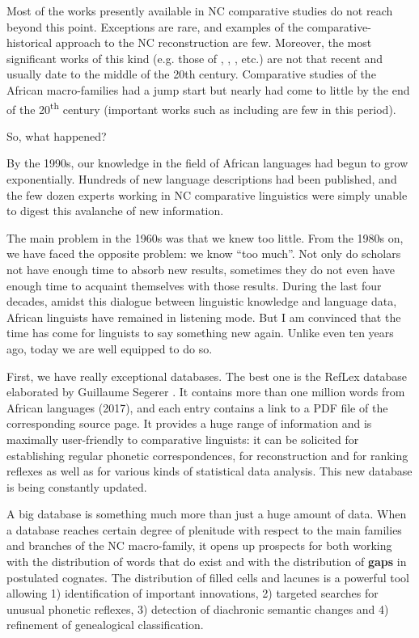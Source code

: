Most of the works presently available in NC comparative studies do not reach beyond this point. Exceptions are rare, and examples of the comparative-his\-tor\-i\-cal approach to the NC reconstruction are few. Moreover, the most significant works of this kind (e.g. those of \citealt{Westermann1927}, \citealt{Greenberg1966}, \citealt{Sebeok1971}, etc.) are not that recent and usually date to the middle of the 20th century. Comparative studies of the African macro-families had a jump start but nearly had come to little by the end of the 20\textsuperscript{th} century (important works such as  \citealt{Bendor-Samuel1989} including \citealt{Williamson1988,Williamson1989a} are few in this period).

So, what happened? 

By the 1990s, our knowledge in the field of African languages had begun to grow exponentially. Hundreds of new language descriptions had been published, and the few dozen experts working in NC comparative linguistics were simply unable to digest this avalanche of new information. 

The main problem in the 1960s was that we knew too little. From the 1980s on, we have faced the opposite problem: we know “too much”. Not only do scholars not have enough time to absorb new results, sometimes they do not even have enough time to acquaint themselves with those results. During the last four decades, amidst this dialogue between linguistic knowledge and language data, African linguists have remained in listening mode. But I am convinced that the time has come for linguists to say something new again. Unlike even ten years ago, today we are well equipped to do so.

 
First, we have really exceptional databases. The best one is the RefLex data\-base elaborated by Guillaume Segerer \citep{RefLex}. It contains more than one million words from African languages (2017), and each entry contains a link to a PDF file of the corresponding source page. It provides a huge range of information and is maximally user-friendly to comparative linguists: it can be solicited for establishing regular phonetic correspondences, for reconstruction and for ranking reflexes as well as for various kinds of statistical data analysis. This new database is being constantly updated. 

A big database is something much more than just a huge amount of data. When a database  reaches certain degree of plenitude with respect to the main families and branches of the NC macro-family, it opens up prospects for both working with the distribution of words that do exist and with the distribution of \textbf{gaps} in postulated cognates. The distribution of filled cells and lacunes is a powerful tool allowing 1) identification of important innovations, 2) targeted searches for unusual phonetic reflexes, 3) detection of diachronic semantic changes and 4) refinement of genealogical classification.

